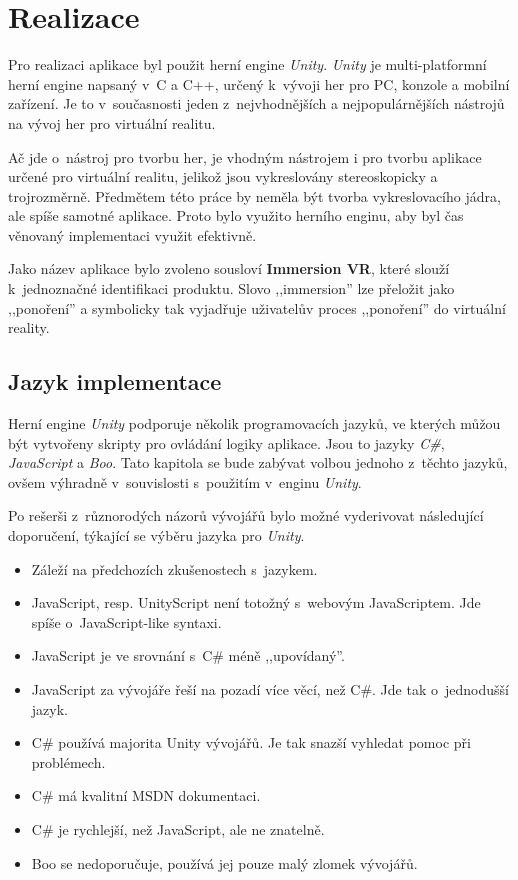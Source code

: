 \chapter{Realizace}\label{realizace}

Pro realizaci aplikace byl použit herní engine \emph{Unity}.
\emph{Unity} je multi-platformní herní engine napsaný v~C a C++, určený
k~vývoji her pro PC, konzole a mobilní zařízení. Je to v~současnosti
jeden z~nejvhodnějších a nejpopulárnějších nástrojů na vývoj her pro
virtuální realitu. \autocite{unitypopularity}

Ač jde o~nástroj pro tvorbu her, je vhodným nástrojem i pro tvorbu
aplikace určené pro virtuální realitu, jelikož jsou vykreslovány 
stereoskopicky a trojrozměrně. Předmětem této práce by neměla 
být tvorba vykreslovacího jádra, ale spíše samotné aplikace. 
Proto bylo využito herního enginu, aby byl čas
věnovaný implementaci využit efektivně.

Jako název aplikace bylo zvoleno sousloví \textbf{Immersion VR}, které
slouží k~jednoznačné identifikaci produktu. Slovo ,,immersion'' lze
přeložit jako ,,ponoření'' a symbolicky tak vyjadřuje uživatelův proces
,,ponoření'' do virtuální reality.

\section{Jazyk implementace}\label{jazyk-implementace}

Herní engine \emph{Unity} podporuje několik programovacích jazyků, ve
kterých můžou být vytvořeny skripty pro ovládání logiky aplikace. Jsou
to jazyky \emph{C\#}, \emph{JavaScript} a \emph{Boo}. \autocite{unitylanguages} Tato kapitola se
bude zabývat volbou jednoho z~těchto jazyků, ovšem výhradně
v~souvislosti s~použitím v~enginu \emph{Unity}.

Po rešerši z~různorodých názorů vývojářů bylo možné vyderivovat
následující doporučení, týkající se výběru jazyka pro \emph{Unity}. \autocite{languagesresearch1} \autocite{languagesresearch2} \autocite{languagesresearch3}

\begin{itemize}
\tightlist
\item
  Záleží na předchozích zkušenostech s~jazykem.
\item
  JavaScript, resp. UnityScript není totožný s~webovým JavaScriptem. Jde
  spíše o~JavaScript-like syntaxi.
\item
  JavaScript je ve srovnání s~C\# méně ,,upovídaný''.
\item
  JavaScript za vývojáře řeší na pozadí více věcí, než C\#. Jde tak
o~jednodušší jazyk.
\item
  C\# používá majorita Unity vývojářů. Je tak snazší vyhledat pomoc při
  problémech.
\item
  C\# má kvalitní MSDN dokumentaci.
\item
  C\# je rychlejší, než JavaScript, ale ne znatelně.
\item
  Boo se nedoporučuje, používá jej pouze malý zlomek vývojářů.
\end{itemize}

